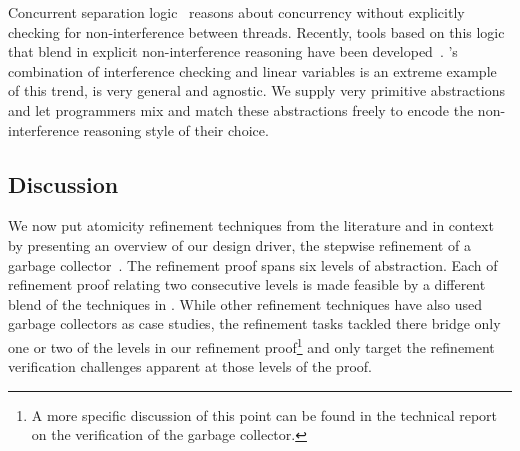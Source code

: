 Concurrent separation logic~\cite{OHearn07} reasons about concurrency without 
explicitly checking for non-interference between threads. 
Recently, tools based on this logic that blend in explicit non-interference reasoning have been developed~\cite{SAGL,RGSep}. 
\civl's combination of interference checking and linear variables is
an extreme example of this trend, is very general and agnostic. We supply very primitive abstractions and let programmers mix and
match these abstractions freely to encode the non-interference
reasoning style of their choice. 

\subsection{Discussion}
We now put atomicity refinement techniques from the literature and
\civl in context by presenting an overview of our design
driver, the stepwise refinement of a garbage collector~\cite{gc-techreport}.
The refinement proof spans six levels of abstraction. 
Each of refinement proof relating two consecutive levels is made feasible by a different
blend of the techniques in \civl. 
While other refinement techniques have also used garbage collectors as
case studies, the refinement tasks tackled there bridge only one or two of the levels in 
our refinement proof\footnote{A more specific discussion of this point
  can be found in the technical report on the verification of the
  garbage collector\cite{gc-techreport}.} and only target the refinement verification
challenges apparent at those levels of the proof. 

